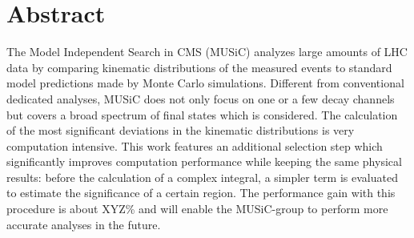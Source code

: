 \section*{Abstract}
The Model Independent Search in CMS (MUSiC) analyzes large amounts of LHC data by comparing kinematic distributions of the measured events to standard model predictions made by Monte Carlo simulations. Different from conventional dedicated analyses, MUSiC does not only focus on one or a few decay channels but covers a broad spectrum of final states which is considered. 
The calculation of the most significant deviations in the kinematic distributions is very computation intensive. This work features an additional selection step which significantly improves computation performance while keeping the same physical results: before the calculation of a complex integral, a simpler term is evaluated to estimate the significance of a certain region. The performance gain with this procedure is about \unit{XYZ}{\%} and will enable the MUSiC-group to perform more accurate analyses in the future.

